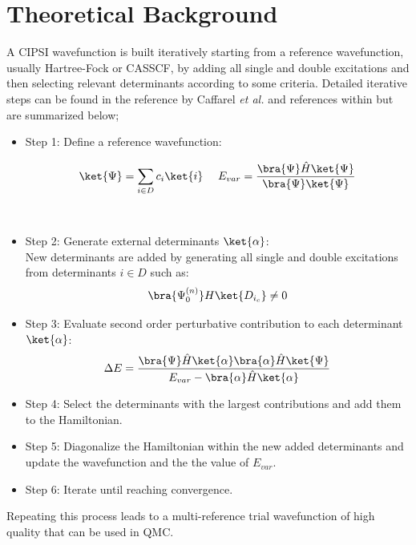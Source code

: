 \section{Theoretical Background}
A CIPSI wavefunction is built iteratively starting from a reference wavefunction, usually Hartree-Fock or CASSCF, by adding all single and double excitations and then selecting relevant determinants according to some criteria. Detailed iterative steps can be found in the reference by Caffarel \textit{et al.} and references within\cite{Caffarel2013, Scemama2016,Scemama2018,Garniron2017-2} but are summarized below; 
\begin{itemize}
\item Step 1: Define a reference wavefunction:

    \begin{equation}
     \begin{gathered}
       \begin{aligned}
         \ket{\Psi}&=\sum_{i\in D} c_i\ket{i} \,         \,
         &E_{var}&= \frac{\bra{\Psi}\hat{H}\ket{\Psi}}{\bra{\Psi}\ket{\Psi}} \\[12pt]
       \end{aligned} \\[12pt]
     \end{gathered}
   \end{equation}

 
 \item Step 2: Generate external determinants $\ket{\alpha}$:\\
New determinants are added by generating all single and double excitations from determinants $i \in D$ such as:\\ 
\begin{equation}
\bra{\Psi_0^{(n)}}H\ket{D_{i_c}}\neq 0
\end{equation}

\item Step 3: Evaluate second order perturbative contribution to each determinant $\ket{\alpha}$:
\begin{equation}
\Delta E=\frac{\bra{\Psi}\hat{H}\ket{\alpha}\bra{\alpha}\hat{H}\ket{\Psi}}{E_{var}-\bra{\alpha}\hat{H}\ket{\alpha}}
\end{equation}

\item Step 4: Select the determinants with the largest contributions and add them to the Hamiltonian.
\item Step 5: Diagonalize the Hamiltonian within the new added determinants and update the wavefunction and the the value of $E_{var}$.
\item Step 6: Iterate until reaching convergence.\\
\end{itemize}
Repeating this process leads to a multi-reference trial wavefunction of high quality that can be used in QMC. 

